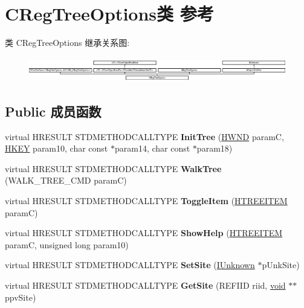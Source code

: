 \hypertarget{class_c_reg_tree_options}{}\section{C\+Reg\+Tree\+Options类 参考}
\label{class_c_reg_tree_options}
类 C\+Reg\+Tree\+Options 继承关系图\+:\begin{figure}[H]
\begin{center}
\leavevmode
\includegraphics[height=1.088083cm]{class_c_reg_tree_options}
\end{center}
\end{figure}
\subsection*{Public 成员函数}
\begin{DoxyCompactItemize}
\item 
\mbox{\label{class_c_reg_tree_options_a3693e9e476e3a26497dcebd744e67b12}} 
virtual H\+R\+E\+S\+U\+LT S\+T\+D\+M\+E\+T\+H\+O\+D\+C\+A\+L\+L\+T\+Y\+PE {\bfseries Init\+Tree} (\hyperlink{interfacevoid}{H\+W\+ND} paramC, \hyperlink{interfacevoid}{H\+K\+EY} param10, char const $\ast$param14, char const $\ast$param18)
\item 
\mbox{\label{class_c_reg_tree_options_a720b29fed1b483ae17abb68952ff3e48}} 
virtual H\+R\+E\+S\+U\+LT S\+T\+D\+M\+E\+T\+H\+O\+D\+C\+A\+L\+L\+T\+Y\+PE {\bfseries Walk\+Tree} (W\+A\+L\+K\+\_\+\+T\+R\+E\+E\+\_\+\+C\+MD paramC)
\item 
\mbox{\label{class_c_reg_tree_options_a586e67f3dc014dd05d2fd18e78bdc399}} 
virtual H\+R\+E\+S\+U\+LT S\+T\+D\+M\+E\+T\+H\+O\+D\+C\+A\+L\+L\+T\+Y\+PE {\bfseries Toggle\+Item} (\hyperlink{struct___t_r_e_e_i_t_e_m}{H\+T\+R\+E\+E\+I\+T\+EM} paramC)
\item 
\mbox{\label{class_c_reg_tree_options_a30f1be42135f85aad601987c26afbb0d}} 
virtual H\+R\+E\+S\+U\+LT S\+T\+D\+M\+E\+T\+H\+O\+D\+C\+A\+L\+L\+T\+Y\+PE {\bfseries Show\+Help} (\hyperlink{struct___t_r_e_e_i_t_e_m}{H\+T\+R\+E\+E\+I\+T\+EM} paramC, unsigned long param10)
\item 
\mbox{\label{class_c_reg_tree_options_a64c632049df861c18e7f09d57c09a02e}} 
virtual H\+R\+E\+S\+U\+LT S\+T\+D\+M\+E\+T\+H\+O\+D\+C\+A\+L\+L\+T\+Y\+PE {\bfseries Set\+Site} (\hyperlink{interface_i_unknown}{I\+Unknown} $\ast$p\+Unk\+Site)
\item 
\mbox{\label{class_c_reg_tree_options_a0ba90a7778f38d491c1092d38fe52127}} 
virtual H\+R\+E\+S\+U\+LT S\+T\+D\+M\+E\+T\+H\+O\+D\+C\+A\+L\+L\+T\+Y\+PE {\bfseries Get\+Site} (R\+E\+F\+I\+ID riid, \hyperlink{interfacevoid}{void} $\ast$$\ast$ppv\+Site)
\end{DoxyCompactItemize}
